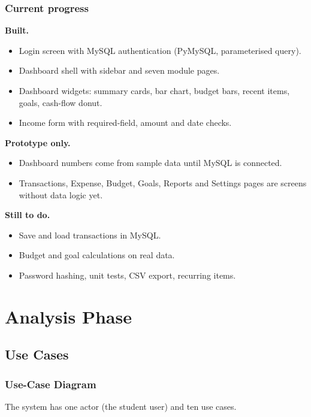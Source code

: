 \documentclass[12pt,a4paper]{article}
\begin{document}
\subsubsection{Current progress}
\textbf{Built.}
\begin{itemize}
  \item Login screen with MySQL authentication (PyMySQL, parameterised query).
  \item Dashboard shell with sidebar and seven module pages.
  \item Dashboard widgets: summary cards, bar chart, budget bars, recent items, goals, cash-flow donut.
  \item Income form with required-field, amount and date checks.
\end{itemize}
\textbf{Prototype only.}
\begin{itemize}
  \item Dashboard numbers come from sample data until MySQL is connected.
  \item Transactions, Expense, Budget, Goals, Reports and Settings pages are screens without data logic yet.
\end{itemize}
\textbf{Still to do.}
\begin{itemize}
  \item Save and load transactions in MySQL.
  \item Budget and goal calculations on real data.
  \item Password hashing, unit tests, CSV export, recurring items.
\end{itemize}

\section{Analysis Phase}

\subsection{Use Cases}

\subsubsection{Use-Case Diagram}
The system has one actor (the student user) and ten use cases.
\end{document}
